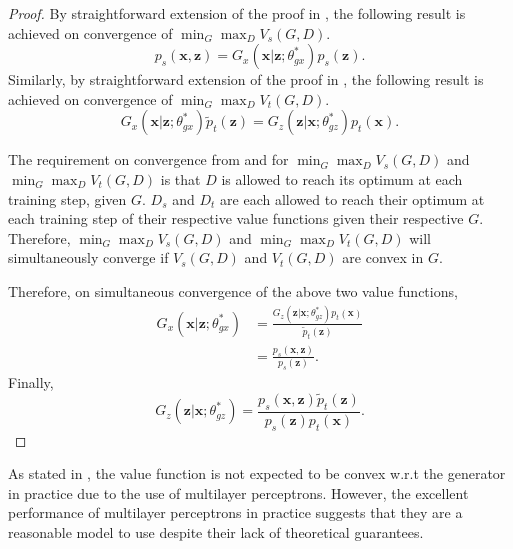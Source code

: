 \documentclass{article}
\begin{document}
\begin{proof}
By straightforward extension of the proof in \cite{goodfellow2014generative}, the following result is achieved on convergence of $\min_{G} \max_{D} V_s(G, D)$. 
\begin{equation}
p_s(\bm{x},\bm{z}) = G_x(\bm{x}|\bm{z};\theta_{gx}^*)p_s(\bm{z}).
\end{equation}
Similarly, by straightforward extension of the proof in \cite{dumoulin2016adversarially}, the following result is achieved on convergence of $\min_{G} \max_{D} V_t(G, D)$.
\begin{equation}
G_x(\bm{x}|\bm{z};\theta_{gx}^*)\widetilde{p}_t(\bm{z}) = G_z(\bm{z}|\bm{x}; \theta_{gz}^*)p_t(\bm{x}).
\end{equation}

The requirement on convergence from \cite{goodfellow2014generative} and \cite{dumoulin2016adversarially} for $\min_{G} \max_{D} V_s(G, D)$ and $\min_{G} \max_{D} V_t(G, D)$ is that $D$ is allowed to reach its optimum at each training step, given $G$. $D_s$ and $D_t$ are each allowed to reach their optimum at each training step of their respective value functions given their respective $G$. Therefore, $\min_{G} \max_{D} V_s(G, D)$ and $\min_{G} \max_{D} V_t(G, D)$ will simultaneously converge if $V_s(G, D)$ and $V_t(G, D)$ are convex in $G$.

Therefore, on simultaneous convergence of the above two value functions,
\begin{equation}
\begin{split}
G_x(\bm{x}|\bm{z};\theta_{gx}^*) &= \frac{G_z(\bm{z}|\bm{x}; \theta_{gz}^*)p_t(\bm{x})}{\widetilde{p}_t(\bm{z})}\\
&= \frac{p_s(\bm{x},\bm{z})}{p_s(\bm{z})}.
\end{split}
\end{equation}
Finally,
\begin{equation}
G_z(\bm{z}|\bm{x}; \theta_{gz}^*) = \frac{p_s(\bm{x},\bm{z})\widetilde{p}_t(\bm{z})}{p_s(\bm{z})p_t(\bm{x})}.
\end{equation}
\end{proof}

As stated in \cite{goodfellow2014generative}, the value function is not expected to be convex w.r.t the generator in practice due to the use of multilayer perceptrons. However, the excellent performance of multilayer perceptrons in practice suggests that they are a reasonable model to use despite their lack of theoretical guarantees. 
\end{document}

